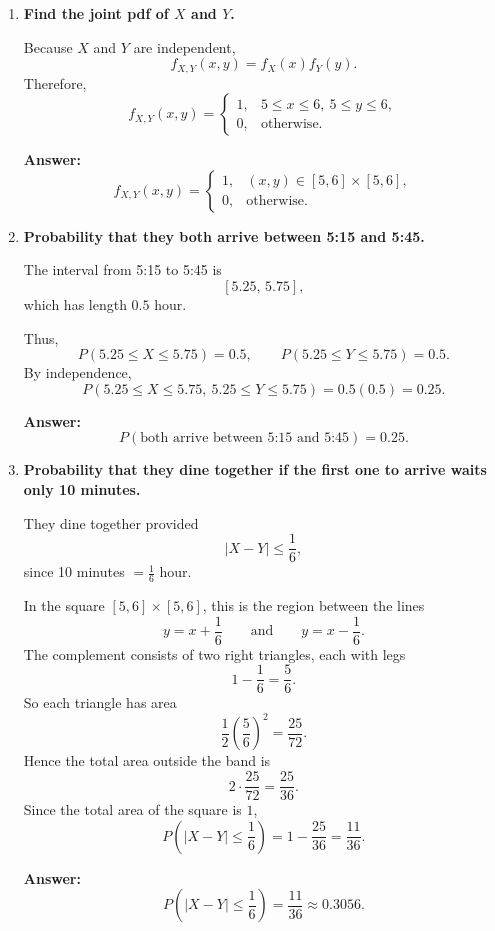 \begin{enumerate}
    \item[(a)] \textbf{Find the joint pdf of $X$ and $Y$.}

    Because $X$ and $Y$ are independent,
    \[
    f_{X,Y}(x,y)=f_X(x)f_Y(y).
    \]
    Therefore,
    \[
    f_{X,Y}(x,y)=
    \begin{cases}
    1, & 5\le x\le 6,\ 5\le y\le 6,\\
    0, & \text{otherwise}.
    \end{cases}
    \]

    \textbf{Answer:}
    \[
    f_{X,Y}(x,y)=
    \begin{cases}
    1, & (x,y)\in [5,6]\times [5,6],\\
    0, & \text{otherwise}.
    \end{cases}
    \]

    \item[(b)] \textbf{Probability that they both arrive between 5:15 and 5:45.}

    The interval from 5:15 to 5:45 is
    \[
    \left[5.25,\,5.75\right],
    \]
    which has length $0.5$ hour.

    Thus,
    \[
    P(5.25\le X\le 5.75)=0.5,
    \qquad
    P(5.25\le Y\le 5.75)=0.5.
    \]
    By independence,
    \[
    P(5.25\le X\le 5.75,\ 5.25\le Y\le 5.75)=0.5(0.5)=0.25.
    \]

    \textbf{Answer:}
    \[
    P(\text{both arrive between 5:15 and 5:45})=0.25.
    \]

    \item[(c)] \textbf{Probability that they dine together if the first one to arrive waits only 10 minutes.}

    They dine together provided
    \[
    |X-Y|\le \frac{1}{6},
    \]
    since 10 minutes $=\frac{1}{6}$ hour.

    In the square $[5,6]\times[5,6]$, this is the region between the lines
    \[
    y=x+\frac{1}{6}
    \qquad \text{and} \qquad
    y=x-\frac{1}{6}.
    \]
    The complement consists of two right triangles, each with legs
    \[
    1-\frac{1}{6}=\frac{5}{6}.
    \]
    So each triangle has area
    \[
    \frac12\left(\frac{5}{6}\right)^2=\frac{25}{72}.
    \]
    Hence the total area outside the band is
    \[
    2\cdot \frac{25}{72}=\frac{25}{36}.
    \]
    Since the total area of the square is $1$,
    \[
    P\left(|X-Y|\le \frac{1}{6}\right)=1-\frac{25}{36}=\frac{11}{36}.
    \]

    \textbf{Answer:}
    \[
    P\left(|X-Y|\le \frac{1}{6}\right)=\frac{11}{36}\approx 0.3056.
    \]
\end{enumerate}

